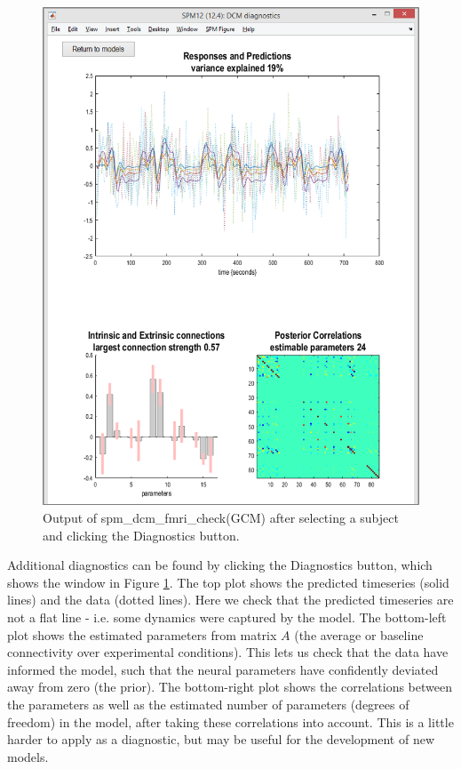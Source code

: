 \documentclass{article}
\begin{document}
\begin{figure}[ht]
\begin{center}
\includegraphics{"Fig_spm_dcm_fmri_check_part2"}
\caption{Output of spm\_dcm\_fmri\_check(GCM) after selecting a subject and clicking the Diagnostics button.\label{Fig_spm_dcm_fmri_check_part2}}
\end{center}
\end{figure}

Additional diagnostics can be found by clicking the Diagnostics button, which shows the window in Figure \ref{Fig_spm_dcm_fmri_check_part2}. The top plot shows the predicted timeseries (solid lines) and the data (dotted lines). Here we check that the predicted timeseries are not a flat line - i.e. some dynamics were captured by the model. The bottom-left plot shows the estimated parameters from matrix \(A\) (the average or baseline connectivity over experimental conditions). This lets us check that the data have informed the model, such that the neural parameters have confidently deviated away from zero (the prior). The bottom-right plot shows the correlations between the parameters as well as the estimated number of parameters (degrees of freedom) in the model, after taking these correlations into account. This is a little harder to apply as a diagnostic, but may be useful for the development of new models.
\end{document}

